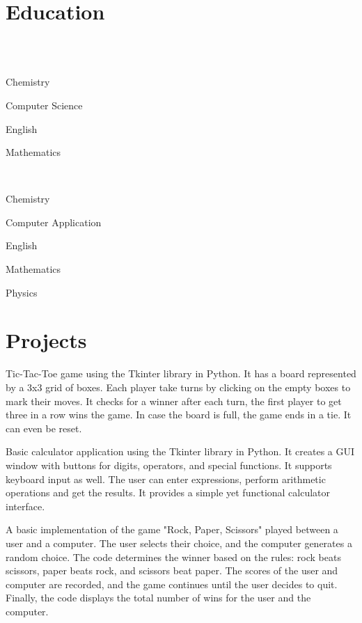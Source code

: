 \documentclass[]{resume}
\begin{document}
\begin{minipage}[t]{0.65\textwidth} 
\section{Education}
\\
\sectionsep
{} \\
\vspace{\topsep} 
\begin{tightemize}
\item Chemistry 
\item Computer Science
\item English
\item Mathematics
\end{tightemize}
\sectionsep
{} \\
\begin{tightemize}
\item Chemistry
\item Computer Application
\item English
\item Mathematics
\item Physics
\end{tightemize}
\sectionsep
\section{Projects}
\descript{}
Tic-Tac-Toe game using the Tkinter library in Python. It has a board represented by a 3x3 grid of boxes. Each player take turns by clicking on the empty boxes to mark their moves. It checks for a winner after each turn, the first player to get three in a row wins the game. In case the board is full, the game ends in a tie. It can even be reset.
\sectionsep 

\descript{}
Basic calculator application using the Tkinter library in Python. It creates a GUI window with buttons for digits, operators, and special functions. It supports keyboard input as well. The user can enter expressions, perform arithmetic operations and get the results. It provides a simple yet functional calculator interface.
\sectionsep

\descript{}
A basic implementation of the game "Rock, Paper, Scissors" played between a user and a computer. The user selects their choice, and the computer generates a random choice. The code determines the winner based on the rules: rock beats scissors, paper beats rock, and scissors beat paper. The scores of the user and computer are recorded, and the game continues until the user decides to quit. Finally, the code displays the total number of wins for the user and the computer.
\sectionsep

\end{minipage} 
\end{document}
